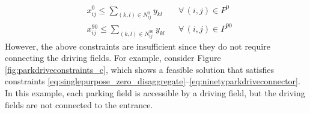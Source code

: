 \documentclass[10pt]{article}
\newcommand{\zeroparkvar}[2]{x^{0}_{#1#2}}
\newcommand{\ninetyparkvar}[2]{x^{90}_{#1#2}}
\newcommand{\drivevar}[2]{y_{#1#2}}
\newcommand{\validzeroparkset}{P^{0}}
\newcommand{\validninetyparkset}{P^{90}}
\newcommand{\zeroneighborset}[2]{N_{#1#2}^{0}}
\newcommand{\ninetyneighborset}[2]{N_{#1#2}^{90}}
\theoremstyle{definition}
\begin{document}
\begin{align}
    & \zeroparkvar{i}{j} \leq \sum_{(k,l) \in \zeroneighborset{i}{j}} \drivevar{k}{l} && \forall\,(i,j) \in \validzeroparkset \label{eq:zeroparkdriveconnector} \\ 
    & \ninetyparkvar{i}{j} \leq \sum_{(k,l) \in \ninetyneighborset{i}{j}} \drivevar{k}{l} && \forall\,(i,j) \in \validninetyparkset \label{eq:ninetyparkdriveconnector}
\end{align}
However, the above constraints are insufficient since they do not require connecting the driving fields. For example, consider Figure \ref{fig:parkdriveconstraints_c}, which shows a feasible solution that satisfies constraints \eqref{eq:singlepurpose_zero_disaggregate}--\eqref{eq:ninetyparkdriveconnector}. In this example, each parking field is accessible by a driving field, but the driving fields are not connected to the entrance.
\end{document}
